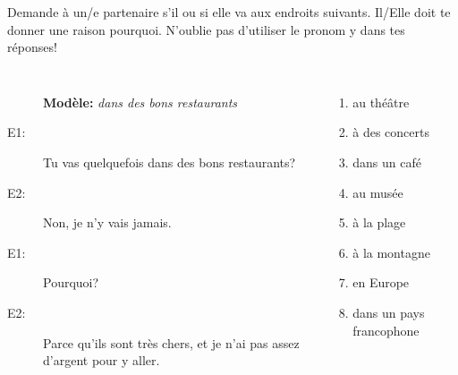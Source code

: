 \documentclass{beamer}
\begin{document}
  \begin{frame}{}
    Demande à un/e partenaire s'il ou si elle va aux endroits suivants.
    Il/Elle doit te donner une raison pourquoi.
    \alert{N'oublie pas} d'utiliser le pronom \alert{y} dans tes réponses!
    \begin{columns}[t]
        \begin{description}
          \item[] \textbf{Modèle:} \textit{dans des bons restaurants}
          \item[E1:] Tu vas quelquefois dans des bons restaurants?
          \item[E2:] Non, je n'\alert{y} vais jamais.
          \item[E1:] Pourquoi?
          \item[E2:] Parce qu'ils sont très chers, et je n'ai pas assez d'argent pour \alert{y} aller.
        \end{description}
        \begin{enumerate}
          \item au théâtre
          \item à des concerts
          \item dans un café
          \item au musée
          \item à la plage
          \item à la montagne
          \item en Europe
          \item dans un pays francophone
        \end{enumerate}
    \end{columns}
  \end{frame}
\end{document}
